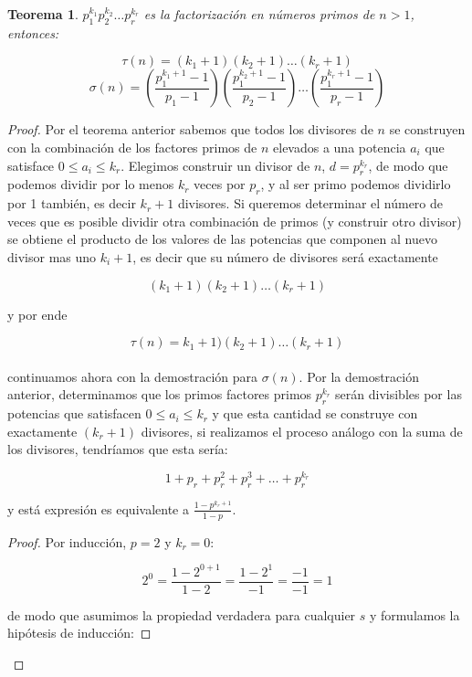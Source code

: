 \documentclass{article}
\newtheorem{theorem}{Teorema}[]
\begin{document}
\begin{theorem} \label{theorem:2}
	$p^{k_1}_{1} p^{k_2}_{2} \dots p^{k_r}_{r}$ es la factorización en números primos de $n>1$, entonces:
	
	$$\tau(n) = (k_1 + 1) (k_2 + 1) \dots (k_r + 1)$$
	$$\sigma(n) = \left( \frac{p^{k_1 + 1}_{1} - 1}{p_{1} - 1} \right) \left( \frac{p^{k_2 + 1}_{1} - 1}{p_{2} - 1} \right) \dots \left( \frac{p^{k_r + 1}_{1} - 1}{p_{r} - 1} \right)$$
\end{theorem}
\begin{proof}
	Por el teorema anterior sabemos que todos los divisores de $n$ se construyen con la combinación de los factores primos de $n$ elevados a una potencia $a_i$ que satisface $0 \leq a_i \leq k_r$. Elegimos construir un divisor de $n$, $d=p^{k_r}_r$, de modo que podemos dividir por lo menos $k_r$ veces por $p_r$, y al ser primo podemos dividirlo por 1 también, es decir $k_r + 1$ divisores. Si queremos determinar el número de veces que es posible dividir otra combinación de primos (y construir otro divisor) se obtiene el producto de los valores de las potencias que componen al nuevo divisor mas uno $k_i + 1$, es decir que su número de divisores será exactamente
	
	$$ (k_1 + 1) (k_2 + 1) \dots (k_r + 1) $$
	
	y por ende
	
	$$\tau(n) = k_1 + 1) (k_2 + 1) \dots (k_r + 1)$$
	
	\paragraph{} continuamos ahora con la demostración para $\sigma(n)$. Por la demostración anterior, determinamos que los primos factores primos $p^{k_r}_r$ serán divisibles por las potencias que satisfacen $0 \leq a_i \leq k_r$ y que esta cantidad se construye con exactamente $(k_r + 1)$ divisores, si realizamos el proceso análogo con la suma de los divisores, tendríamos que esta sería:
	
	$$1 + p_r + p^{2}_r + p^{3}_r + \dots + p^{k_r}_r$$

	y está expresión es equivalente a $\frac{1 - p^{k_r + 1}}{1 - p}$.
	
	\begin{proof}
		Por inducción, $p=2$ y $k_r=0$:
		
		$$2^0 = \frac{1 - 2^{0 + 1}}{1 - 2} = \frac{1 - 2^{1}}{-1} = \frac{-1}{-1} = 1$$
		
		de modo que asumimos la propiedad verdadera para cualquier $s$ y formulamos la hipótesis de inducción:
		

\end{proof}
\end{proof}
\end{document}
